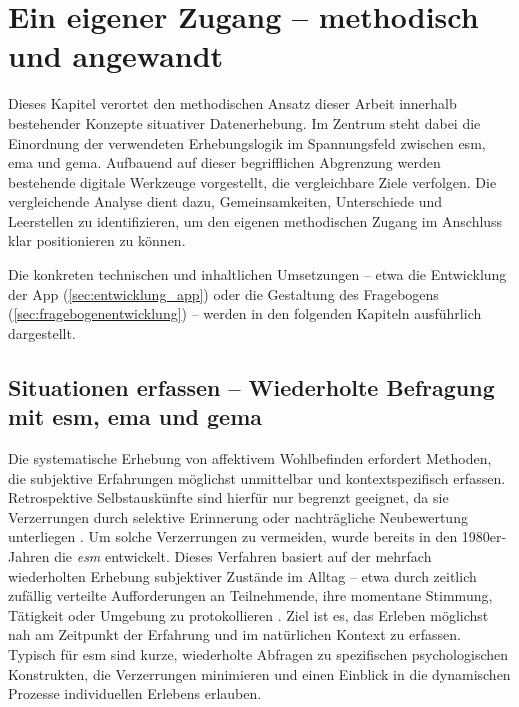 
\section{Ein eigener Zugang -- methodisch und angewandt} \label{sec:methodik}

Dieses Kapitel verortet den methodischen Ansatz dieser Arbeit innerhalb bestehender Konzepte situativer Datenerhebung. Im Zentrum steht dabei die Einordnung der verwendeten Erhebungslogik im Spannungsfeld zwischen \acrfull{esm}, \acrfull{ema} und \acrfull{gema}. Aufbauend auf dieser begrifflichen Abgrenzung werden bestehende digitale Werkzeuge vorgestellt, die vergleichbare Ziele verfolgen. Die vergleichende Analyse dient dazu, Gemeinsamkeiten, Unterschiede und Leerstellen zu identifizieren, um den eigenen methodischen Zugang im Anschluss klar positionieren zu können.

Die konkreten technischen und inhaltlichen Umsetzungen -- etwa die Entwicklung der App (\cref{sec:entwicklung_app}) oder die Gestaltung des Fragebogens (\cref{sec:fragebogenentwicklung}) -- werden in den folgenden Kapiteln ausführlich dargestellt.


\subsection{Situationen erfassen -- Wiederholte Befragung mit \acrshort{esm}, \acrshort{ema} und \acrshort{gema}}

Die systematische Erhebung von affektivem Wohlbefinden erfordert Methoden, die subjektive Erfahrungen möglichst unmittelbar und kontextspezifisch erfassen. Retrospektive Selbstauskünfte sind hierfür nur begrenzt geeignet, da sie Verzerrungen durch selektive Erinnerung oder nachträgliche Neubewertung unterliegen \parencite[\textit{Recall Bias},][]{kahnemanDevelopmentsMeasurementSubjective2006}. Um solche Verzerrungen zu vermeiden, wurde bereits in den 1980er-Jahren die \emph{\acrfull{esm}} entwickelt. Dieses Verfahren basiert auf der mehrfach wiederholten Erhebung subjektiver Zustände im Alltag -- etwa durch zeitlich zufällig verteilte Aufforderungen an Teilnehmende, ihre momentane Stimmung, Tätigkeit oder Umgebung zu protokollieren \parencite{csikszentmihalyiValidityReliabilityExperienceSampling1987}. Ziel ist es, das Erleben möglichst nah am Zeitpunkt der Erfahrung und im natürlichen Kontext zu erfassen. Typisch für \acrshort{esm} sind kurze, wiederholte Abfragen zu spezifischen psychologischen Konstrukten, die Verzerrungen minimieren und einen Einblick in die dynamischen Prozesse individuellen Erlebens erlauben.

